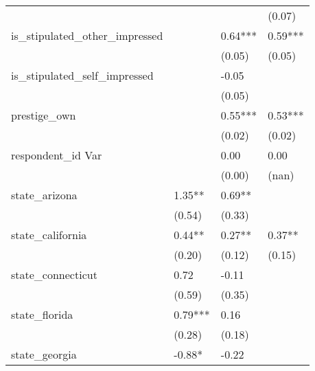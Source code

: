 \begin{table}
\begin{center}
\begin{tabular}{llll}
                                                   &                        &              & (0.07)         \\
    is\_stipulated\_other\_impressed               &                        & 0.64***      & 0.59***        \\
                                                   &                        & (0.05)       & (0.05)         \\
    is\_stipulated\_self\_impressed                &                        & -0.05        &                \\
                                                   &                        & (0.05)       &                \\
    prestige\_own                                  &                        & 0.55***      & 0.53***        \\
                                                   &                        & (0.02)       & (0.02)         \\
    respondent\_id Var                             &                        & 0.00         & 0.00           \\
                                                   &                        & (0.00)       & (nan)          \\
    state\_arizona                                 & 1.35**                 & 0.69**       &                \\
                                                   & (0.54)                 & (0.33)       &                \\
    state\_california                              & 0.44**                 & 0.27**       & 0.37**         \\
                                                   & (0.20)                 & (0.12)       & (0.15)         \\
    state\_connecticut                             & 0.72                   & -0.11        &                \\
                                                   & (0.59)                 & (0.35)       &                \\
    state\_florida                                 & 0.79***                & 0.16         &                \\
                                                   & (0.28)                 & (0.18)       &                \\
    state\_georgia                                 & -0.88*                 & -0.22        &                \\

\end{tabular}
\end{center}
\end{table}
